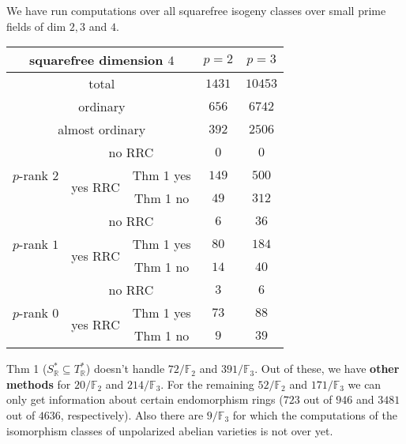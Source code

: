 \documentclass[usenames,dvipsnames,handout]{beamer}
\def\R{\mathbb{R}}
\def\F{\mathbb{F}}
\begin{document}
\begin{frame}{ }{}
{\small
	We have run computations over all squarefree isogeny classes over small prime fields of dim $2,3$ and $4$.
}
\pause 
\begin{table}[ht]
    \centering
\footnotesize	
    \begin{tabular}{|c|c|c|c|c|}\hline
\multicolumn{3}{|c|}{squarefree dimension $4$}                  & $p=2$ & $p=3$ \\\hline
\multicolumn{3}{|c|}{total}                                     & $1431$ & $10453$  \\\hline                    
\multicolumn{3}{|c|}{ordinary}                                  & $656$ & $6742$  \\\hline
\multicolumn{3}{|c|}{almost ordinary}                           & $392$ & $2506$  \\\hline
\multirow{3}{*}{$p$-rank $2$} & \multicolumn{2}{|c|}{no RRC}    & $0$ & $0$ \\\cline{2-5}
                              & \multirow{2}{*}{yes RRC} & Thm 1 yes & $149$ & $500$   \\\cline{3-5}
                              &                          & Thm 1 no  & $49$ & $312$   \\\hline
\multirow{3}{*}{$p$-rank $1$} & \multicolumn{2}{|c|}{no RRC}    & $6$ & $36$ \\\cline{2-5}
                              & \multirow{2}{*}{yes RRC} & Thm 1 yes & $80$ & $184$   \\\cline{3-5}
                              &                          & Thm 1 no  & $14$ & $40$   \\\hline
\multirow{3}{*}{$p$-rank $0$} & \multicolumn{2}{|c|}{no RRC}    & $3$ & $6$   \\\cline{2-5}
                              & \multirow{2}{*}{yes RRC} & Thm 1 yes & $73$ & $88$ \\\cline{3-5}
                              &                          & Thm 1 no  & $9$ & $39$ \\\hline                              
    \end{tabular}
    \label{tab:dim4}
\end{table}
\pause
{\small
	Thm 1 ($S^*_\R\subseteq T^*_\R$) doesn't handle $72/\F_2$ and $391/\F_3$.
\pause	
	Out of these, we have {\bf other methods} for $20/\F_2$ and $214/\F_3$.
\pause
	For the remaining $52/\F_2$ and $171/\F_3$ we can only get information about certain endomorphism rings ($723$ out of $946$ and $3481$ out of $4636$, respectively).
\pause	
	Also there are $9/\F_3$ for which the computations of the isomorphism classes of unpolarized abelian varieties is not over yet.
}
\end{frame}
\end{document}
